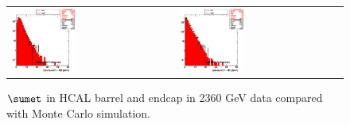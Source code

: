 \begin{figure}[h!]
 \centering
 \begin{tabular}{ll}
  \includegraphics[width=0.40\textwidth]{plots_DataVsMC_MB_2360GeV/h_caloSumetHB.eps} &
  \includegraphics[width=0.40\textwidth]{plots_DataVsMC_MB_2360GeV/h_caloSumetHE.eps} \\
 \end{tabular}
 \caption{$\sumet$ in HCAL barrel and endcap in 2360 GeV data compared
   with Monte Carlo simulation.
          \label{fig:DataVsMC_MB_2360_5}}
\end{figure}

